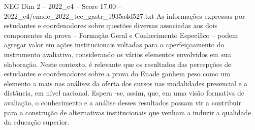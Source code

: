 \begin{textsample}{NEG Dim 2 – 2022\_c4 – Score 17.00 – 2022\_c4/enade\_2022\_tec\_gastr\_1935a4d527.txt}
As informações expressas por estudantes e coordenadores sobre questões diversas associadas aos dois componentes da prova – Formação Geral e Conhecimento Específico – podem agregar valor em ações institucionais voltadas para o aperfeiçoamento do instrumento avaliativo, considerando os vários elementos envolvidos em sua elaboração.
Neste contexto, é relevante que os resultados das percepções de estudantes e coordenadores sobre a prova do Enade ganhem peso como um elemento a mais nas análises da oferta dos cursos nas modalidades presencial e a distância, em nível nacional.
Espera -se, assim, que, em uma visão formativa de avaliação, o conhecimento e a análise desses resultados possam vir a contribuir para a construção de alternativas institucionais que venham a induzir a qualidade da educação superior.

\end{textsample}
